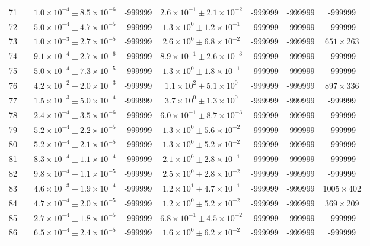 \begin{table}
\begin{tabular}{cccccccc}
71 &  & $1.0\times10^{-4}\pm 8.5\times10^{-6}$ & -999999 & $2.6\times10^{-1}\pm 2.1\times10^{-2}$ & -999999 & -999999 & -999999 \\
72 &  & $5.0\times10^{-4}\pm 4.7\times10^{-5}$ & -999999 & $1.3\times10^{0}\pm 1.2\times10^{-1}$ & -999999 & -999999 & -999999 \\
73 &  & $1.0\times10^{-3}\pm 2.7\times10^{-5}$ & -999999 & $2.6\times10^{0}\pm 6.8\times10^{-2}$ & -999999 & -999999 & $651\times 263$ \\
74 &  & $9.1\times10^{-4}\pm 2.7\times10^{-6}$ & -999999 & $8.9\times10^{-1}\pm 2.6\times10^{-3}$ & -999999 & -999999 & -999999 \\
75 &  & $5.0\times10^{-4}\pm 7.3\times10^{-5}$ & -999999 & $1.3\times10^{0}\pm 1.8\times10^{-1}$ & -999999 & -999999 & -999999 \\
76 &  & $4.2\times10^{-2}\pm 2.0\times10^{-3}$ & -999999 & $1.1\times10^{2}\pm 5.1\times10^{0}$ & -999999 & -999999 & $897\times 336$ \\
77 &  & $1.5\times10^{-3}\pm 5.0\times10^{-4}$ & -999999 & $3.7\times10^{0}\pm 1.3\times10^{0}$ & -999999 & -999999 & -999999 \\
78 &  & $2.4\times10^{-4}\pm 3.5\times10^{-6}$ & -999999 & $6.0\times10^{-1}\pm 8.7\times10^{-3}$ & -999999 & -999999 & -999999 \\
79 &  & $5.2\times10^{-4}\pm 2.2\times10^{-5}$ & -999999 & $1.3\times10^{0}\pm 5.6\times10^{-2}$ & -999999 & -999999 & -999999 \\
80 &  & $5.2\times10^{-4}\pm 2.1\times10^{-5}$ & -999999 & $1.3\times10^{0}\pm 5.2\times10^{-2}$ & -999999 & -999999 & -999999 \\
81 &  & $8.3\times10^{-4}\pm 1.1\times10^{-4}$ & -999999 & $2.1\times10^{0}\pm 2.8\times10^{-1}$ & -999999 & -999999 & -999999 \\
82 &  & $9.8\times10^{-4}\pm 1.1\times10^{-5}$ & -999999 & $2.5\times10^{0}\pm 2.8\times10^{-2}$ & -999999 & -999999 & -999999 \\
83 &  & $4.6\times10^{-3}\pm 1.9\times10^{-4}$ & -999999 & $1.2\times10^{1}\pm 4.7\times10^{-1}$ & -999999 & -999999 & $1005\times 402$ \\
84 &  & $4.7\times10^{-4}\pm 2.0\times10^{-5}$ & -999999 & $1.2\times10^{0}\pm 5.2\times10^{-2}$ & -999999 & -999999 & $369\times 209$ \\
85 &  & $2.7\times10^{-4}\pm 1.8\times10^{-5}$ & -999999 & $6.8\times10^{-1}\pm 4.5\times10^{-2}$ & -999999 & -999999 & -999999 \\
86 &  & $6.5\times10^{-4}\pm 2.4\times10^{-5}$ & -999999 & $1.6\times10^{0}\pm 6.2\times10^{-2}$ & -999999 & -999999 & -999999 \\

\end{tabular}
\end{table}
